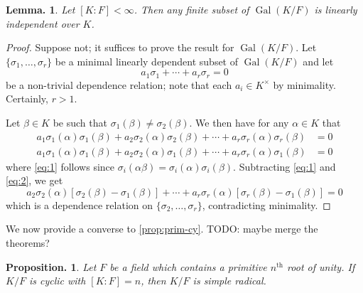 \documentclass[11pt, a4paper]{memoir}
\theoremstyle{change}
\newtheorem{lemma}[theorem]{Lemma.}
\newtheorem{proposition}[theorem]{Proposition.}
\theoremstyle{plain}
\theoremstyle{nonumberplain}
\newtheorem{proof}{Proof}
\DeclareMathOperator{\Gal}{Gal}
\numberwithin{equation}{section}
\begin{document}
\begin{lemma}
    Let $[K:F]<\infty$.
    Then any finite subset of $\Gal(K/F)$ is linearly independent over $K$.
\end{lemma}
\begin{proof}
    Suppose not; it suffices to prove the result for $\Gal(K/F)$.
    Let $\{\sigma_1,\ldots,\sigma_r\}$ be a minimal linearly dependent subset of $\Gal(K/F)$ and let
    \begin{equation*}
        a_1\sigma_1+\cdots+a_r\sigma_r=0
    \end{equation*}
    be a non-trivial dependence relation; note that each $a_i\in K^\times$ by minimality.
    Certainly, $r>1$.

    Let $\beta\in K$ be such that $\sigma_1(\beta)\neq\sigma_2(\beta)$.
    We then have for any $\alpha\in K$ that
    \begin{align}
        a_1\sigma_1(\alpha)\sigma_1(\beta)+a_2\sigma_2(\alpha)\sigma_2(\beta)+\cdots+a_r\sigma_r(\alpha)\sigma_r(\beta)&=0\label{eq:1}\\
        a_1\sigma_1(\alpha)\sigma_1(\beta)+a_2\sigma_2(\alpha)\sigma_1(\beta)+\cdots+a_r\sigma_r(\alpha)\sigma_1(\beta)&=0\label{eq:2}
    \end{align}
    where \cref{eq:1} follows since $\sigma_i(\alpha\beta)=\sigma_i(\alpha)\sigma_i(\beta)$.
    Subtracting \cref{eq:1} and \cref{eq:2}, we get
    \begin{equation*}
        a_2\sigma_2(\alpha)[\sigma_2(\beta)-\sigma_1(\beta)]+\cdots+a_r\sigma_r(\alpha)[\sigma_r(\beta)-\sigma_1(\beta)]=0
    \end{equation*}
    which is a dependence relation on $\{\sigma_2,\ldots,\sigma_r\}$, contradicting minimality.
\end{proof}
We now provide a converse to \cref{prop:prim-cy}.
TODO: maybe merge the theorems?
\begin{proposition}
    Let $F$ be a field which contains a primitive $n^\text{th}$ root of unity.
    If $K/F$ is cyclic with $[K:F]=n$, then $K/F$ is simple radical.
\end{proposition}
\end{document}
